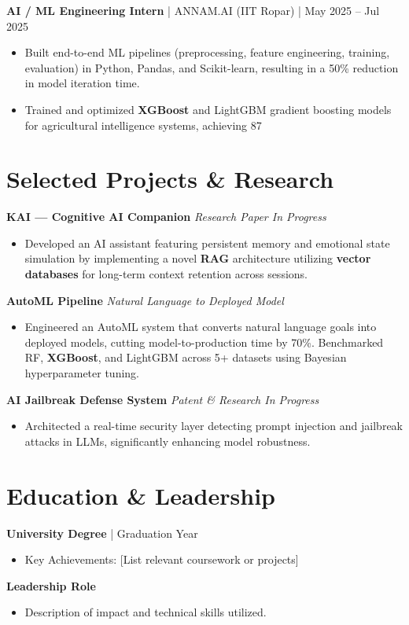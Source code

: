 \documentclass[10pt, letterpaper]{article}
\begin{document}
\textbf{AI / ML Engineering Intern} | ANNAM.AI (IIT Ropar) | May 2025 – Jul 2025
\begin{itemize}
    \item Built end-to-end ML pipelines (preprocessing, feature engineering, training, evaluation) in Python, Pandas, and Scikit-learn, resulting in a 50\% reduction in model iteration time.
    \item Trained and optimized \textbf{XGBoost} and LightGBM gradient boosting models for agricultural intelligence systems, achieving 87%
\end{itemize}

\section*{Selected Projects & Research}
\textbf{KAI — Cognitive AI Companion} \hfill \textit{Research Paper In Progress}
\begin{itemize}
    \item Developed an AI assistant featuring persistent memory and emotional state simulation by implementing a novel \textbf{RAG} architecture utilizing \textbf{vector databases} for long-term context retention across sessions.
\end{itemize}

\textbf{AutoML Pipeline} \hfill \textit{Natural Language to Deployed Model}
\begin{itemize}
    \item Engineered an AutoML system that converts natural language goals into deployed models, cutting model-to-production time by 70\%. Benchmarked RF, \textbf{XGBoost}, and LightGBM across 5+ datasets using Bayesian hyperparameter tuning.
\end{itemize}

\textbf{AI Jailbreak Defense System} \hfill \textit{Patent & Research In Progress}
\begin{itemize}
    \item Architected a real-time security layer detecting prompt injection and jailbreak attacks in LLMs, significantly enhancing model robustness.
\end{itemize}

\section*{Education & Leadership}
\textbf{University Degree} | Graduation Year
\begin{itemize}
    \item Key Achievements: [List relevant coursework or projects]
\end{itemize}
\textbf{Leadership Role}
\begin{itemize}
    \item Description of impact and technical skills utilized.
\end{itemize}
\end{document}
